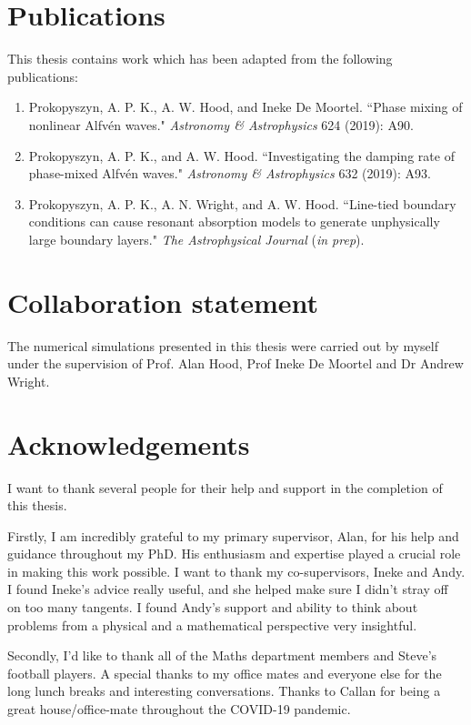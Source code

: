 \documentclass[12pt,fleqn]{report}
\numberwithin{equation}{section}
\begin{document}
\newpage

\section*{Publications}

This thesis contains work which has been adapted from the following publications:

\begin{enumerate}
    \item Prokopyszyn, A. P. K., A. W. Hood, and Ineke De Moortel. ``Phase mixing of nonlinear Alfvén waves." \textit{Astronomy \& Astrophysics} 624 (2019): A90.
    \item Prokopyszyn, A. P. K., and A. W. Hood. ``Investigating the damping rate of phase-mixed Alfvén waves." \textit{Astronomy \& Astrophysics} 632 (2019): A93.
    \item Prokopyszyn, A. P. K., A. N. Wright, and A. W. Hood. ``Line-tied boundary conditions can cause resonant absorption models to generate unphysically large boundary layers." \textit{The Astrophysical Journal} (\textit{in prep}).
\end{enumerate}

\section*{Collaboration statement}

The numerical simulations presented in this thesis were carried out by myself under
the supervision of Prof. Alan Hood, Prof Ineke De Moortel and Dr Andrew Wright.

\newpage

\section*{Acknowledgements}

I want to thank several people for their help and support in the completion of this thesis.

Firstly, I am incredibly grateful to my primary supervisor, Alan, for his help and guidance throughout my PhD. His enthusiasm and expertise played a crucial role in making this work possible. I want to thank my co-supervisors, Ineke and Andy. I found Ineke's advice really useful, and she helped make sure I didn't stray off on too many tangents. I found Andy's support and ability to think about problems from a physical and a mathematical perspective very insightful.

Secondly, I'd like to thank all of the Maths department members and Steve's football players. A special thanks to my office mates and everyone else for the long lunch breaks and interesting conversations. Thanks to Callan for being a great house/office-mate throughout the COVID-19 pandemic.
\end{document}
